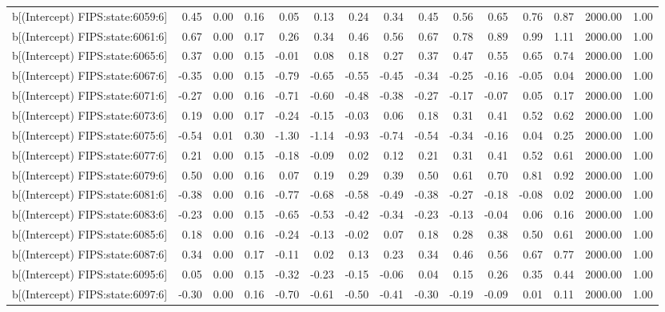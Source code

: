 \begin{table}[ht]
\begin{tabular}{rrrrrrrrrrrrrrr}
  b[(Intercept) FIPS:state:6059:6] & 0.45 & 0.00 & 0.16 & 0.05 & 0.13 & 0.24 & 0.34 & 0.45 & 0.56 & 0.65 & 0.76 & 0.87 & 2000.00 & 1.00 \\ 
  b[(Intercept) FIPS:state:6061:6] & 0.67 & 0.00 & 0.17 & 0.26 & 0.34 & 0.46 & 0.56 & 0.67 & 0.78 & 0.89 & 0.99 & 1.11 & 2000.00 & 1.00 \\ 
  b[(Intercept) FIPS:state:6065:6] & 0.37 & 0.00 & 0.15 & -0.01 & 0.08 & 0.18 & 0.27 & 0.37 & 0.47 & 0.55 & 0.65 & 0.74 & 2000.00 & 1.00 \\ 
  b[(Intercept) FIPS:state:6067:6] & -0.35 & 0.00 & 0.15 & -0.79 & -0.65 & -0.55 & -0.45 & -0.34 & -0.25 & -0.16 & -0.05 & 0.04 & 2000.00 & 1.00 \\ 
  b[(Intercept) FIPS:state:6071:6] & -0.27 & 0.00 & 0.16 & -0.71 & -0.60 & -0.48 & -0.38 & -0.27 & -0.17 & -0.07 & 0.05 & 0.17 & 2000.00 & 1.00 \\ 
  b[(Intercept) FIPS:state:6073:6] & 0.19 & 0.00 & 0.17 & -0.24 & -0.15 & -0.03 & 0.06 & 0.18 & 0.31 & 0.41 & 0.52 & 0.62 & 2000.00 & 1.00 \\ 
  b[(Intercept) FIPS:state:6075:6] & -0.54 & 0.01 & 0.30 & -1.30 & -1.14 & -0.93 & -0.74 & -0.54 & -0.34 & -0.16 & 0.04 & 0.25 & 2000.00 & 1.00 \\ 
  b[(Intercept) FIPS:state:6077:6] & 0.21 & 0.00 & 0.15 & -0.18 & -0.09 & 0.02 & 0.12 & 0.21 & 0.31 & 0.41 & 0.52 & 0.61 & 2000.00 & 1.00 \\ 
  b[(Intercept) FIPS:state:6079:6] & 0.50 & 0.00 & 0.16 & 0.07 & 0.19 & 0.29 & 0.39 & 0.50 & 0.61 & 0.70 & 0.81 & 0.92 & 2000.00 & 1.00 \\ 
  b[(Intercept) FIPS:state:6081:6] & -0.38 & 0.00 & 0.16 & -0.77 & -0.68 & -0.58 & -0.49 & -0.38 & -0.27 & -0.18 & -0.08 & 0.02 & 2000.00 & 1.00 \\ 
  b[(Intercept) FIPS:state:6083:6] & -0.23 & 0.00 & 0.15 & -0.65 & -0.53 & -0.42 & -0.34 & -0.23 & -0.13 & -0.04 & 0.06 & 0.16 & 2000.00 & 1.00 \\ 
  b[(Intercept) FIPS:state:6085:6] & 0.18 & 0.00 & 0.16 & -0.24 & -0.13 & -0.02 & 0.07 & 0.18 & 0.28 & 0.38 & 0.50 & 0.61 & 2000.00 & 1.00 \\ 
  b[(Intercept) FIPS:state:6087:6] & 0.34 & 0.00 & 0.17 & -0.11 & 0.02 & 0.13 & 0.23 & 0.34 & 0.46 & 0.56 & 0.67 & 0.77 & 2000.00 & 1.00 \\ 
  b[(Intercept) FIPS:state:6095:6] & 0.05 & 0.00 & 0.15 & -0.32 & -0.23 & -0.15 & -0.06 & 0.04 & 0.15 & 0.26 & 0.35 & 0.44 & 2000.00 & 1.00 \\ 
  b[(Intercept) FIPS:state:6097:6] & -0.30 & 0.00 & 0.16 & -0.70 & -0.61 & -0.50 & -0.41 & -0.30 & -0.19 & -0.09 & 0.01 & 0.11 & 2000.00 & 1.00 \\ 

\end{tabular}
\end{table}
